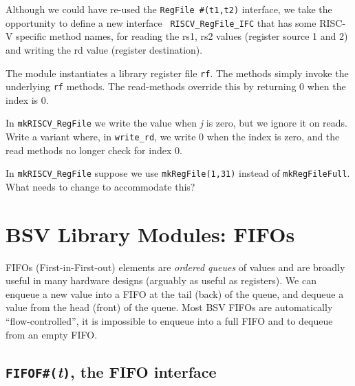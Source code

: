 Although we could have re-used the {\tt RegFile \#(t1,t2)} interface,
we take the opportunity to define a new interface {\tt
RISCV\_RegFile\_IFC} that has some RISC-V specific method names, for
reading the rs1, rs2 values (register source 1 and 2) and writing the
rd value (register destination).

The module instantiates a library register file {\tt rf}.  The methods
simply invoke the underlying {\tt rf} methods.  The read-methods
override this by returning 0 when the index is 0.

\hdivider

\Exercise
\hm In {\tt mkRISCV\_RegFile} we write the value when \emph{j} is zero, but we
ignore it on reads.  Write a variant where, in {\tt write\_rd}, we
write 0 when the index is zero, and the read methods no longer check
for index 0.

\Exercise
\hm In {\tt mkRISCV\_RegFile} suppose we use {\tt mkRegFile(1,31)} instead of
{\tt mkRegFileFull}.  What needs to change to accommodate this?

\Endexercise


\section{BSV Library Modules: FIFOs}


FIFOs (First-in-First-out) elements are \emph{ordered queues} of
values and are broadly useful in many hardware designs (arguably as
useful as registers).  We can enqueue a new value into a FIFO at the
tail (back) of the queue, and dequeue a value from the head (front) of
the queue.  Most BSV FIFOs are automatically ``flow-controlled'',
{\ie} it is impossible to enqueue into a full FIFO and to dequeue from
an empty FIFO.


\subsection{{\tt FIFOF\#(}\emph{t}{\tt )}, the FIFO interface}

\label{Sec_FIFOF_interface}


